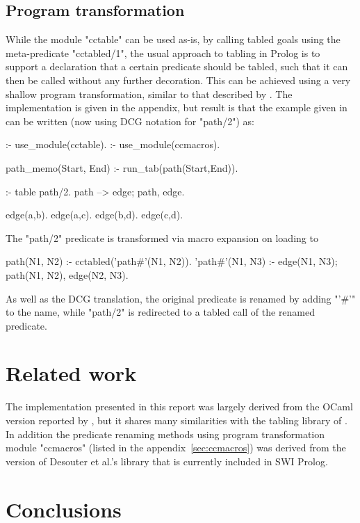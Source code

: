 \subsection{Program transformation}
While the module "cctable" can be used as-is, by calling tabled goals using the
meta-predicate "cctabled/1", the usual approach to tabling in Prolog is to support a
declaration that a certain predicate should be tabled, such that it can then be
called without any further decoration. This can be achieved using a very shallow
program transformation, similar to that described by \cite{DesouterVan-DoorenSchrijvers2015}.
The implementation is given in the appendix, but result is that the example given 
in  can be written (now using DCG notation for "path/2") as:
\begin{prolog-framed}
  :- use_module(cctable).
  :- use_module(ccmacros).

  path_memo(Start, End) :- run_tab(path(Start,End)).

  :- table path/2.
  path --> edge; path, edge.

  edge(a,b).
  edge(a,c).
  edge(b,d).
  edge(c,d).
\end{prolog-framed}
The "path/2" predicate is transformed via macro expansion on loading to
\begin{prolog}
  path(N1, N2)    :- cctabled('path#'(N1, N2)).
  'path#'(N1, N3) :- edge(N1, N3); path(N1, N2), edge(N2, N3).
\end{prolog}
As well as the DCG translation, the original predicate is renamed by
adding "'#'" to the name, while "path/2" is redirected to a tabled
call of the renamed predicate.



\section{Related work}
The implementation presented in this report was largely derived from the OCaml
version reported by \cite{Abdallah2017a}, but it shares many similarities with
the tabling library of \cite{DesouterVan-DoorenSchrijvers2015}. In addition the
predicate renaming methods using program transformation module "ccmacros" 
(listed in the appendix~\ref{sec:ccmacros}) was derived from the version of Desouter et al.'s
library that is currently included in SWI Prolog.

\section{Conclusions}

